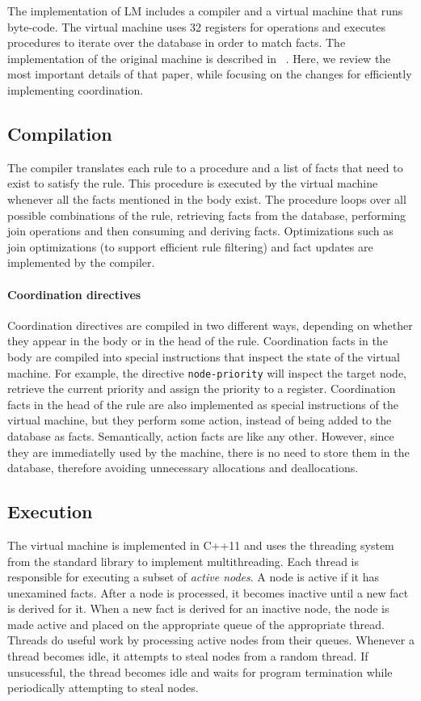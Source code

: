 The implementation of LM includes a compiler and a virtual machine that runs
byte-code. The virtual machine uses 32 registers for
operations and executes procedures to iterate over the database in order to match facts.
The implementation of the original machine is described in ~\cite{cruz-ppdp14}.
Here, we review the most important details of that paper, while focusing on the
changes for efficiently implementing coordination.

\subsection{Compilation}

The compiler translates each rule to a procedure and a list of facts that need
to exist to satisfy the rule. This procedure is executed by the virtual
machine whenever all the facts mentioned in the body exist.
The procedure loops over all possible combinations of the rule, retrieving facts from the
database, performing join operations and then consuming and deriving facts.
Optimizations such as join optimizations (to support efficient rule filtering)
and fact updates are implemented by the compiler.

\paragraph{Coordination directives}
Coordination directives are compiled in two different ways, depending on whether they
appear in the body or in the head of the rule. Coordination facts in the body
are compiled into special instructions that inspect the state of the virtual
machine. For example, the directive \texttt{node-priority} will inspect the
target node, retrieve the current priority and assign the priority to a
register. Coordination facts in the head of the rule are also implemented as
special instructions of the virtual machine, but they perform some action,
instead of being added to the database as facts.
Semantically, action facts are like any other. However, since they are
immediatelly used by the machine, there is no need to store them in the
database, therefore avoiding unnecessary allocations and deallocations.

\subsection{Execution}

The virtual machine is implemented in C++11 and uses the threading system from
the standard library to implement multithreading. Each thread is responsible for
executing a subset of \emph{active nodes}. A node is active if it has unexamined
facts. After a node is processed, it becomes inactive until a new fact is
derived for it. When a new fact is derived for an
inactive node, the node is made active and placed on the appropriate queue of
the appropriate thread.  Threads do useful work by processing active nodes from their queues. Whenever a
thread becomes idle, it attempts to steal nodes from a random thread.
If unsucessful, the thread becomes idle and waits for program
termination while periodically attempting to steal nodes.

